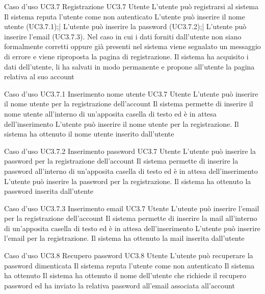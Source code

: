 \UCtitle
{Caso d'uso UC3.7}
{Registrazione}
\UC
{UC3.7}
{Utente}
{L'utente può registrarsi al sistema}
{Il sistema reputa l'utente come non autenticato}
\scenario
{L'utente può inserire il nome utente (UC3.7.1);|
L'utente può inserire la password (UC3.7.2);|
L'utente può inserire l'email (UC3.7.3).
}
\scenarioAlt
{Nel caso in cui i dati forniti dall'utente non siano formalmente corretti oppure già presenti nel sistema viene segnalato un messaggio di errore e viene riproposta la pagina di registrazione.
}
\post
{Il sistema ha acquisito i dati dell'utente, li ha salvati in modo permanente e propone all'utente la pagina relativa al suo account}

\UCtitle
{Caso d'uso UC3.7.1}
{Inserimento nome utente}
\UC
{UC3.7}
{Utente}
{L'utente può inserire il nome utente per la registrazione dell'account}
{Il sistema permette di inserire il nome utente all'interno di un'apposita casella di testo ed è in attesa dell'inserimento}
\scenario
{L'utente può inserire il nome utente per la registrazione.}
\post
{Il sistema ha ottenuto il nome utente inserito dall'utente}

\UCtitle
{Caso d'uso UC3.7.2}
{Inserimento password}
\UC
{UC3.7}
{Utente}
{L'utente può inserire la password per la registrazione dell'account}
{Il sistema permette di inserire la password all'interno di un'apposita casella di testo ed è in attesa dell'inserimento}
\scenario
{L'utente può inserire la password per la registrazione.}
\post
{Il sistema ha ottenuto la password inserita dall'utente}

\UCtitle
{Caso d'uso UC3.7.3}
{Inserimento email}
\UC
{UC3.7}
{Utente}
{L'utente può inserire l'email per la registrazione dell'account}
{Il sistema permette di inserire la mail all'interno di un'apposita casella di testo ed è in attesa dell'inserimento}
\scenario
{L'utente può inserire l'email per la registrazione.}
\post
{Il sistema ha ottenuto la mail inserita dall'utente}

\UCtitle
{Caso d'uso UC3.8}
{Recupero password}
\UC
{UC3.8}
{Utente}
{L'utente può recuperare la password dimenticata}
{Il sistema reputa l'utente come non autenticato}
Il sistema ha ottenuto
\post
{Il sistema ha ottenuto il nome dell'utente che richiede il recupero password ed ha inviato la relativa password all'email associata all'account}
